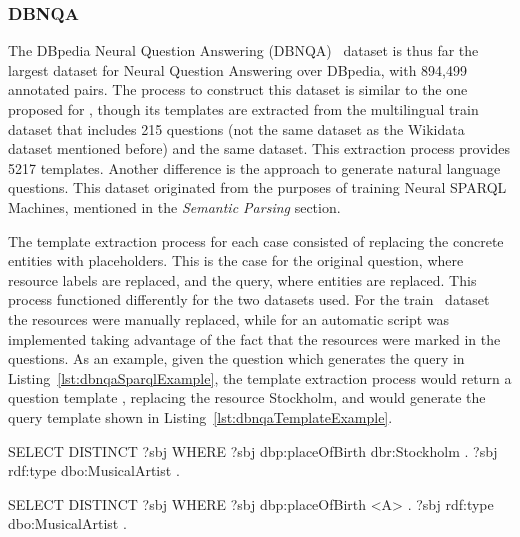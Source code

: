 \subsubsection{DBNQA}
\label{cap2:qakg/benchmarkDatasets/dbnqa}
The DBpedia Neural Question Answering (DBNQA)~\cite{dataset:dbnqa-hartmann-marx-soru-2018} dataset 
is thus far the largest dataset for Neural Question Answering over DBpedia, with 894,499 annotated 
pairs. The process to construct this dataset is similar to the one proposed for \LCQuADone{}, though its 
templates are extracted from the multilingual \QALDseven{} train dataset that includes 215 questions 
(not the same dataset as the Wikidata \QALDseven{} dataset mentioned before) and the same \LCQuADone 
dataset. This extraction process provides 5217 \SPARQL{} templates. Another difference is the 
approach to generate natural language questions. This dataset originated from the purposes of 
training Neural SPARQL Machines, mentioned in the \textit{Semantic Parsing} section.

The template extraction process for each case consisted of replacing the concrete entities 
with placeholders. This is the case for the original question, where resource labels are 
replaced, and the query, where entities are replaced. This process functioned differently for 
the two datasets used. For the \QALDseven{} train~\cite{dataset:qald7-UsbeckNHKRN17} dataset the 
resources were manually replaced, while for \LCQuADone{} an automatic script was implemented taking 
advantage of the fact that the resources were marked in the questions. As an example, given the 
question  which generates the query 
in Listing~\ref{lst:dbnqaSparqlExample}, the template extraction process would return a 
question template , replacing the 
resource Stockholm, and would generate the query template shown in Listing~\ref{lst:dbnqaTemplateExample}.

\begin{sparqlcode}[%
    caption={\SPARQL{} query for the question: \dquotesit{What are the artists that are born in Stockholm?}.}, 
    label={lst:dbnqaSparqlExample}]
SELECT DISTINCT ?sbj WHERE {
    ?sbj dbp:placeOfBirth dbr:Stockholm .
    ?sbj rdf:type dbo:MusicalArtist .
}
\end{sparqlcode}

\begin{sparqlcode}[%
    caption={Query Template for the question: \dquotesit{What are the artists that are born in <A>?}.}, 
    label={lst:dbnqaTemplateExample}]
SELECT DISTINCT ?sbj WHERE {
    ?sbj dbp:placeOfBirth <A> .
    ?sbj rdf:type dbo:MusicalArtist .
}
\end{sparqlcode}

